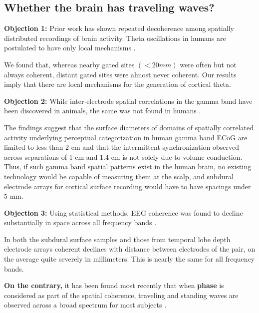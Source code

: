 \subsection{Whether the brain has traveling waves?}
\textbf{Objection 1:} Prior work has shown repeated decoherence among spatially distributed recordings of brain activity. Theta oscillations in humans are postulated to have only local mechanisms \cite{doi:10.1152/jn.00409.2005}. 
\begin{displayquote}
 We found that, whereas nearby gated sites $(<20 \textit{mm})$ were often but not always coherent, distant gated sites were almost never coherent. Our results imply that there are local mechanisms for the generation of cortical theta.
\end{displayquote}
\textbf{Objection 2:} While inter-electrode spatial correlations in the gamma band have been discovered in animals, the same was not found in humans \cite{MENON199689}.
\begin{displayquote}
The findings suggest that the surface diameters of domains of spatially correlated activity underlying perceptual categorization in human gamma band ECoG are limited to less than 2 cm and that the intermittent synchronization observed across separations of 1 cm and 1.4 cm is not solely due to volume conduction. Thus, if such gamma band spatial patterns exist in the human brain, no existing technology would be capable of measuring them at the scalp, and subdural electrode arrays for cortical surface recording would have to have spacings under 5 mm.
\end{displayquote}
\textbf{Objection 3:} Using statistical methods, EEG coherence was found to decline substantially in space across all frequency bands \cite{BULLOCK1995161}.
\begin{displayquote}
In both the subdural surface samples and those from temporal lobe depth electrode arrays coherent declines with distance between electrodes of the pair, on the average quite severely in millimeters. This is nearly the same for all frequency bands. 
\end{displayquote}
\textbf{On the contrary,} it has been found most recently that when \textbf{phase} is considered as part of the spatial coherence, traveling and standing waves are observed across a broad spectrum for most subjects \cite{ZHANG20181269}.









